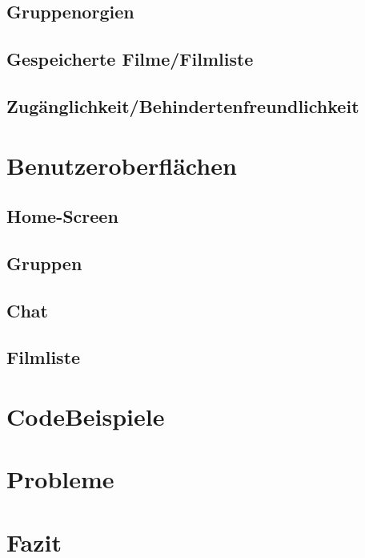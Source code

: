 \documentclass[11pt,a4paper]{article}
\begin{document}
\subsection{Gruppenorgien}		
\subsection{Gespeicherte Filme/Filmliste}		
\subsection{Zugänglichkeit/Behindertenfreundlichkeit}		


\section{Benutzeroberflächen}
\subsection{Home-Screen}
\subsection{Gruppen}		
\subsection{Chat}		
\subsection{Filmliste}

\section{CodeBeispiele}


\section{Probleme}


\section{Fazit}
\newpage
\end{document}
